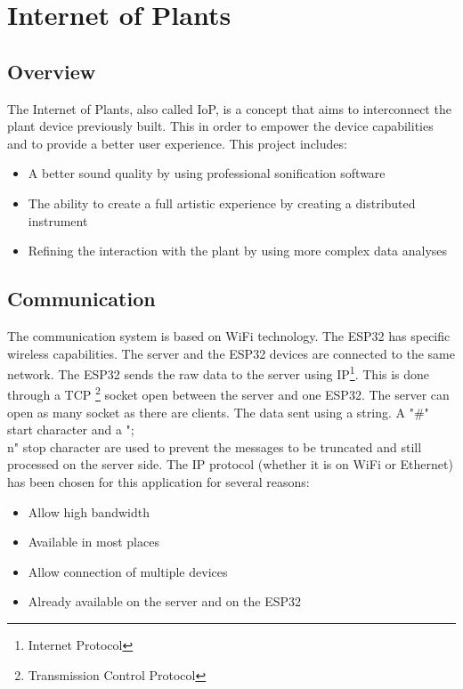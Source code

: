 \section{Internet of Plants}

\subsection{Overview}

The Internet of Plants, also called IoP, is a concept that aims to interconnect the plant device previously built.
This in order to empower the device capabilities and to provide a better user experience.
This project includes:
\begin{itemize}
    \item A better sound quality by using professional sonification software
    \item The ability to create a full artistic experience by creating a distributed instrument
    \item Refining the interaction with the plant by using more complex data analyses
\end{itemize}



\subsection{Communication}

The communication system is based on WiFi technology. The ESP32 has specific wireless capabilities.
The server and the ESP32 devices are connected to the same network.
The ESP32 sends the raw data to the server using IP\footnote{Internet Protocol}. This is done
through a TCP \footnote{Transmission Control Protocol} socket open between the server and one ESP32.
The server can open as many socket as there are clients. The data sent using a string.
A "#" start character and a ";\\n" stop character are used to prevent the messages to 
be truncated and still processed on the server side. The IP protocol (whether it is on WiFi
or Ethernet) has been chosen for this application for several reasons:

\begin{itemize}
    \item Allow high bandwidth
    \item Available in most places
    \item Allow connection of multiple devices
    \item Already available on the server and on the ESP32
\end{itemize}

